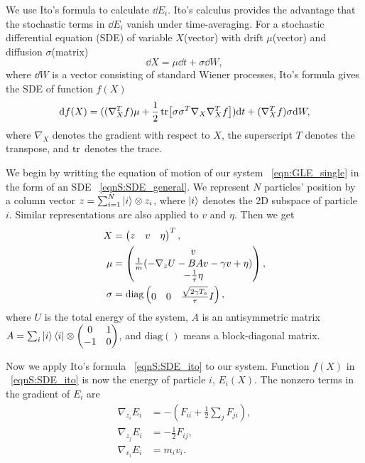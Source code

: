 \documentclass[
 amsmath,amssymb,
 aps,
 pre,
 longbibliography,
 10pt, onecolumn,
 notitlepage
]{revtex4-1}
\begin{document}
We use Ito's formula to calculate $\dd E_i$. 
Ito's calculus provides the advantage that the stochastic terms in $\dd E_i$ vanish under time-averaging.
For a stochastic differential equation (SDE) of variable $X$(vector) with drift $\mu$(vector) and diffusion $\sigma$(matrix)
\begin{equation} \label{eqnS:SDE_general}
\dd X = \mu \dd t + \sigma \dd W ,
\end{equation}
where $\dd W$ is a vector consisting of standard Wiener processes,
Ito's formula gives the SDE of function $f(X)$
\begin{equation} \label{eqnS:SDE_ito}
\dd f(X) = ((\nabla_X^Tf)\mu + \frac{1}{2}\tr[\sigma \sigma^T \nabla_X\nabla_X^Tf])\dd t + (\nabla_X^Tf) \sigma \dd W,
\end{equation}
where $\nabla_X$ denotes the gradient with respect to $X$, the superscript $T$ denotes the transpose, and $\tr$ denotes the trace.

We begin by writting the equation of motion of our system \eqnname~\eqref{eqn:GLE_single} in the form of an SDE \eqnname~\eqref{eqnS:SDE_general}.
We represent $N$ particles' position by a column vector $z = \sum_{i=1}^N \ket{i}\otimes z_i$, where $\ket{i}$ denotes the 2D subspace of particle $i$. Similar representations are also applied to $v$ and $\eta$. 
Then we get
\begin{align}
X &= \pmqty{ z & v & \eta }^T, \label{eqnS:SDE_X}\\
\mu &= \pmqty{ v \\
\frac{1}{m}(-\nabla_zU - BAv - \gamma v + \eta) \\
-\frac{1}{\tau}\eta }, \label{eqnS:SDE_mu} \\
\sigma &= \text{diag} \pmqty{0 & 0 & \frac{\sqrt{2\gamma T_a}}{\tau} I}, \label{eqnS:SDE_sigma}
\end{align}
where $U$ is the total energy of the system, $A$ is an antisymmetric matrix $A=\sum_i \ket{i}\bra{i}\otimes \mqty(0 & 1 \\ -1 & 0)$, and $\text{diag}()$ means a block-diagonal matrix.

Now we apply Ito's formula \eqnname~\eqref{eqnS:SDE_ito} to our system.
Function $f(X)$ in \eqnname~\eqref{eqnS:SDE_ito} is now the energy of particle $i$, $E_i(X)$.
The nonzero terms in the gradient of $E_i$ are
\begin{align}
\nabla_{z_i}E_i &= -(F_{ii} + \frac{1}{2}\sum_jF_{ji}), \\
\nabla_{z_j}E_i &= -\frac{1}{2}F_{ij}, \\
\nabla_{v_i}E_i &= m_iv_i.
\end{align}
\end{document}
